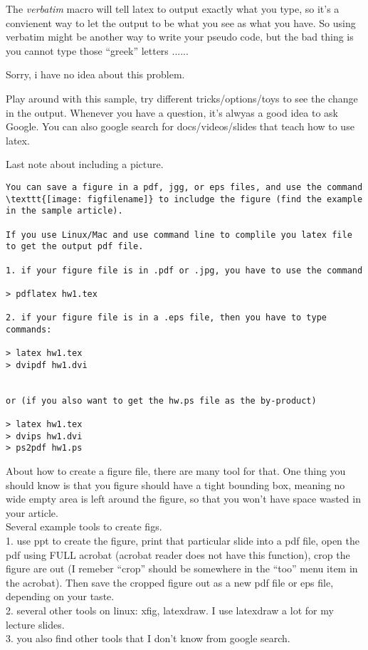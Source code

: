 \documentclass[11pt]{article}
\begin{document}
The {\em verbatim} macro will tell latex to output exactly what you
type, so it's a convienent way to let the output to be what you see as
what you have. So using verbatim might be another way to write your
pseudo code, but the bad thing is you cannot type those ``greek''
letters ......  

\bigskip


Sorry, i have no idea about this problem. 

\vspace*{+1cm}

{\LARGE 
Play around with this sample, try different tricks/options/toys to see
the change in the output. Whenever you have a question, it's alwyas a
good idea to ask Google. You can also google search for
docs/videos/slides that teach how to use latex. 
}



Last note about including a picture. 

\begin{verbatim}
You can save a figure in a pdf, jgg, or eps files, and use the command
\texttt{[image: figfilename]} to includge the figure (find the example
in the sample article). 

If you use Linux/Mac and use command line to complile you latex file
to get the output pdf file. 

1. if your figure file is in .pdf or .jpg, you have to use the command

> pdflatex hw1.tex

2. if your figure file is in a .eps file, then you have to type
commands:

> latex hw1.tex
> dvipdf hw1.dvi


or (if you also want to get the hw.ps file as the by-product)

> latex hw1.tex
> dvips hw1.dvi
> ps2pdf hw1.ps

\end{verbatim}

\newpage
About how to create a figure file, there are many tool for that. One
thing you should know is that you figure should have a tight bounding
box, meaning no wide empty area is left around the figure, so that
you won't have space wasted in your article.\\


Several example tools to create figs. \\

1. use ppt to create the figure, print that particular slide into a
pdf file, open the pdf using FULL acrobat (acrobat reader does not
have this function), crop the figure are out (I remeber ``crop''
should be somewhere in the ``too'' menu item in the acrobat).  Then
save the cropped figure out as a new pdf file or eps file, depending
on your taste. \\

2. several other tools on linux: xfig, latexdraw. I use latexdraw a
lot for my lecture slides. \\

3. you also find other tools that I don't know from google search.  
\end{document}
